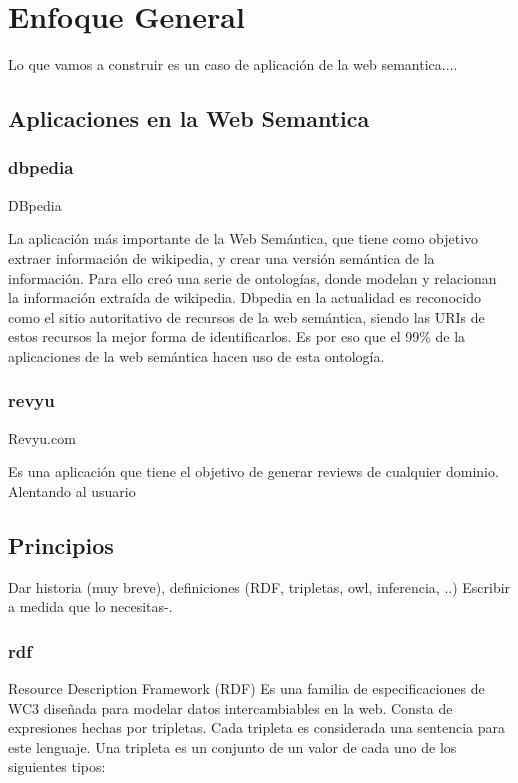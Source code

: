 \chapter{Enfoque General}
\label{chapter:estrategia}

Lo que vamos a construir es un caso de aplicación de la web semantica....

\section{Aplicaciones en la Web Semantica}

\subsection{dbpedia}

DBpedia

La aplicación más importante de la Web Semántica, que tiene como objetivo extraer información de wikipedia, y crear una versión semántica 
de la información. Para ello creó una serie de ontologías, donde modelan y relacionan la información extraída de wikipedia.
Dbpedia en la actualidad es reconocido como el sitio autoritativo de recursos de la web semántica, siendo las URIs de estos recursos 
la mejor forma de identificarlos.
Es por eso que el 99\% de la aplicaciones de la web semántica hacen uso de esta ontología.

\subsection{revyu}

Revyu.com

Es una aplicación que tiene el objetivo de generar reviews de cualquier dominio. Alentando al usuario 

\section{Principios}
Dar historia (muy breve), definiciones  (RDF, tripletas, owl, inferencia, ..)
Escribir a medida que lo necesitas-.

\subsection{rdf}
Resource Description Framework (RDF)
Es una familia de especificaciones de WC3 diseñada para modelar datos intercambiables en la web. 
Consta de expresiones hechas por tripletas. Cada tripleta es considerada una sentencia para este lenguaje.
Una tripleta es un conjunto de un valor de cada uno de los siguientes tipos:

